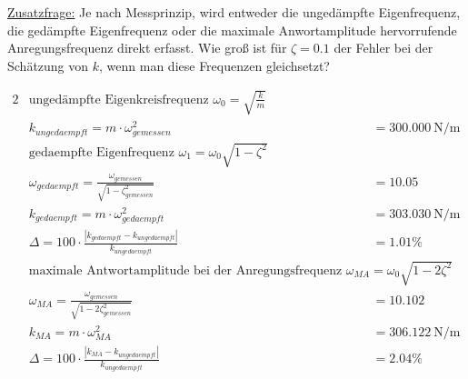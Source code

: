     \underline{Zusatzfrage:} Je nach Messprinzip, wird entweder die ungedämpfte
    Eigenfrequenz, die gedämpfte Eigenfrequenz oder die maximale Anwortamplitude
    hervorrufende Anregungsfrequenz direkt erfasst. Wie groß ist für $\zeta = 0.1$ der
    Fehler bei der Schätzung von $k$, wenn man diese Frequenzen gleichsetzt?

    \begin{solution}
        \begin{alignat*}{2}
            &\text{ungedämpfte Eigenkreisfrequenz  } \omega_0 = \sqrt{\frac{k}{m}} \\
            &k_{ungedaempft} = m \cdot \omega_{gemessen}^2 &&= \SI{300.000}{\newton \per \meter} \\
            &\text{gedaempfte Eigenfrequenz  } \omega_1 = \omega_0 \sqrt{1-\zeta^2} \\
            &\omega_{gedaempft} = \frac{\omega_{gemessen}}{\sqrt{1-\zeta_{gemessen}^2}} &&= 10.05\\
            &k_{gedaempft} = m \cdot \omega_{gedaempft}^2 &&= \SI{303.030}{\newton \per \meter}\\
            &\Delta = 100 \cdot \frac{|k_{gedaempft} - k_{ungedaempft}|}{k_{ungedaempft}} &&= 1.01 \%\\
            &\text{maximale Antwortamplitude bei der Anregungsfrequenz  } \omega_{MA} = \omega_0 \sqrt{1-2 \zeta^2} \\
            &\omega_{MA} = \frac{\omega_{gemessen}}{\sqrt{1-2\zeta_{gemessen}^2}} &&= 10.102\\
            &k_{MA} = m \cdot \omega_{MA}^2 &&= \SI{306.122}{\newton \per \meter}\\
            &\Delta = 100 \cdot \frac{|k_{MA} - k_{ungedaempft}|}{k_{ungedaempft}} &&= 2.04 \% \\ 
        \end{alignat*}
    \end{solution}

